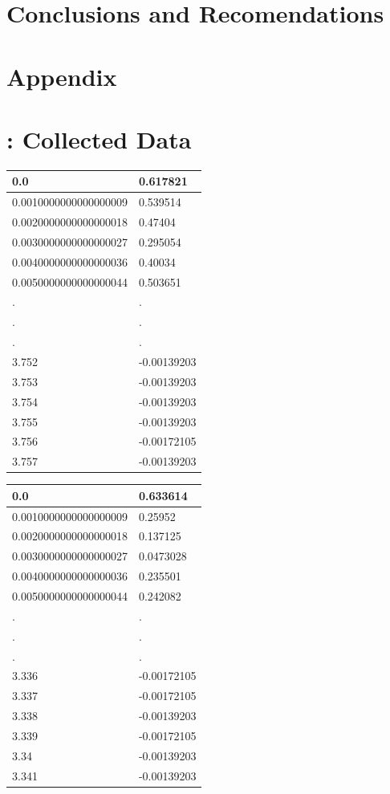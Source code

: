 \documentclass[a4paper, 12pt]{article}
\begin{document}
\section*{Conclusions and Recomendations}

\appendix
\section*{Appendix}
\section{: Collected Data}
\begin{center}
\begin{tabular}{|l|l|}\hline
0.0&0.617821\\ \hline
0.0010000000000000009&0.539514\\ \hline
0.0020000000000000018&0.47404\\ \hline
0.0030000000000000027&0.295054\\ \hline
0.0040000000000000036&0.40034\\ \hline
0.0050000000000000044&0.503651\\ \hline
.&.\\
.&.\\
.&.\\
3.752&-0.00139203\\ \hline
3.753&-0.00139203\\ \hline
3.754&-0.00139203\\ \hline
3.755&-0.00139203\\ \hline
3.756&-0.00172105\\ \hline
3.757&-0.00139203\\ \hline
	\end{tabular}
\end{center}
\begin{center}
\begin{tabular}{|l|l|}\hline
0.0&0.633614\\ \hline
0.0010000000000000009&0.25952\\ \hline
0.0020000000000000018&0.137125\\ \hline
0.0030000000000000027&0.0473028\\ \hline
0.0040000000000000036&0.235501\\ \hline
0.0050000000000000044&0.242082\\ \hline
.&.\\
.&.\\
.&.\\
3.336&-0.00172105\\ \hline
3.337&-0.00172105\\ \hline
3.338&-0.00139203\\ \hline
3.339&-0.00172105\\ \hline
3.34&-0.00139203\\ \hline
3.341&-0.00139203\\ \hline
	\end{tabular}
\end{center}
\end{document}
